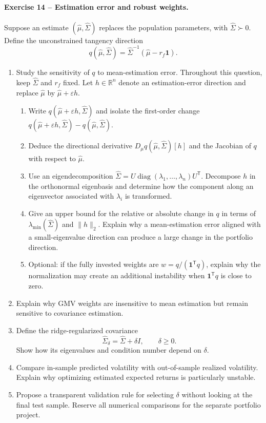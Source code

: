 \documentclass[10pt]{article}
\newcommand{\trans}{^{\mathsf T}}
\begin{document}
\paragraph{Exercise 14 -- Estimation error and robust weights.}
Suppose an estimate $(\widehat\mu,\widehat\Sigma)$ replaces the population
parameters, with $\widehat\Sigma\succ0$. Define the unconstrained tangency
direction
\[
q(\widehat\mu,\widehat\Sigma)
=\widehat\Sigma^{-1}(\widehat\mu-r_f\mathbf1).
\]
\begin{enumerate}
\item Study the sensitivity of $q$ to mean-estimation error. Throughout this
question, keep $\widehat\Sigma$ and $r_f$ fixed. Let $h\in\mathbb R^n$ denote
an estimation-error direction and replace $\widehat\mu$ by
$\widehat\mu+\varepsilon h$.
  \begin{enumerate}[label=(\alph*)]
  \item Write $q(\widehat\mu+\varepsilon h,\widehat\Sigma)$ and isolate the
  first-order change
  $q(\widehat\mu+\varepsilon h,\widehat\Sigma)
  -q(\widehat\mu,\widehat\Sigma)$.
  \item Deduce the directional derivative
  $D_{\mu}q(\widehat\mu,\widehat\Sigma)[h]$ and the Jacobian of $q$ with
  respect to $\widehat\mu$.
  \item Use an eigendecomposition
  $\widehat\Sigma=U\operatorname{diag}(\lambda_1,\ldots,\lambda_n)U\trans$.
  Decompose $h$ in the orthonormal eigenbasis and determine how the component
  along an eigenvector associated with $\lambda_i$ is transformed.
  \item Give an upper bound for the relative or absolute change in $q$ in
  terms of $\lambda_{\min}(\widehat\Sigma)$ and $\lVert h\rVert_2$. Explain
  why a mean-estimation error aligned with a small-eigenvalue direction can
  produce a large change in the portfolio direction.
  \item Optional: if the fully invested weights are
  $w=q/(\mathbf1\trans q)$, explain why the normalization may create an
  additional instability when $\mathbf1\trans q$ is close to zero.
  \end{enumerate}
\item Explain why GMV weights are insensitive to mean estimation but remain
sensitive to covariance estimation.
\item Define the ridge-regularized covariance
\[
\widehat\Sigma_\delta=\widehat\Sigma+\delta I,
\qquad \delta\geq0.
\]
Show how its eigenvalues and condition number depend on $\delta$.
\item Compare in-sample predicted volatility with out-of-sample realized
volatility. Explain why optimizing estimated expected returns is particularly
unstable.
\item Propose a transparent validation rule for selecting $\delta$ without
looking at the final test sample. Reserve all numerical comparisons for the
separate portfolio project.
\end{enumerate}
\end{document}
